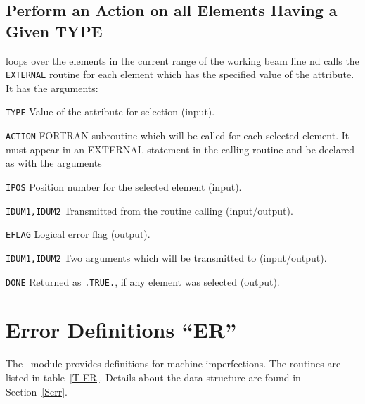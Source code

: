 \section{Perform an Action on all Elements Having a Given TYPE}
\label{ENSTYP}
loops over the elements in the current range of the working beam line
nd calls the {\tt EXTERNAL} routine  for each element
which has the specified value of the  attribute.
It has the arguments:
\begin{mylist}
\item[\tt TYPE]
Value of the  attribute for selection (input).
\item[\tt ACTION]
FORTRAN subroutine which will be called for each selected element.
It must appear in an EXTERNAL statement in the calling routine
and be declared as
with the arguments
\begin{mylist}
\item[\tt IPOS]
Position number for the selected element (input).
\item[\tt IDUM1,IDUM2]
Transmitted from the routine calling  (input/output).
\item[\tt EFLAG]
Logical error flag (output).
\end{mylist}
\item[\tt IDUM1,IDUM2]
Two arguments which will be transmitted to 
(input/output).
\item[\tt DONE]
Returned as {\tt .TRUE.}, if any element was selected (output).
\end{mylist}


\chapter{Error Definitions ``ER''}
\label{ER}
The ~module provides definitions for machine imperfections.
The routines are listed in table~\ref{T-ER}.
Details about the data structure are found in Section~\ref{Serr}.

